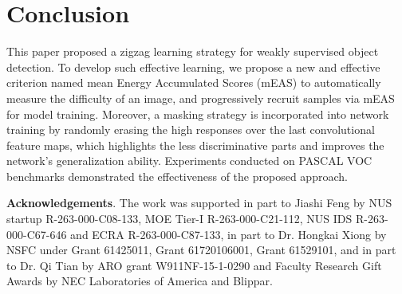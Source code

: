 \documentclass[10pt,twocolumn,letterpaper]{article}
\begin{document}
\section{Conclusion}
This paper proposed a zigzag learning strategy for weakly supervised object detection. To develop such effective learning, we propose a new and effective criterion named mean Energy Accumulated Scores (mEAS) to automatically measure the difficulty of an image, and progressively recruit samples via mEAS for model training. Moreover, a masking strategy is incorporated into network training by randomly erasing the high responses over the last convolutional feature maps, which highlights the less discriminative parts and improves the network's generalization ability. Experiments conducted on PASCAL VOC benchmarks demonstrated the effectiveness of the proposed approach.


\noindent \small{\textbf{Acknowledgements}. The work was supported in part to Jiashi Feng by NUS startup R-263-000-C08-133, MOE Tier-I R-263-000-C21-112, NUS IDS R-263-000-C67-646 and ECRA R-263-000-C87-133, in part to Dr. Hongkai Xiong by NSFC under Grant 61425011, Grant 61720106001, Grant 61529101, and in part to Dr. Qi Tian by ARO grant W911NF-15-1-0290 and Faculty Research Gift Awards by NEC Laboratories of America and Blippar}.

{\small


}
\end{document}
